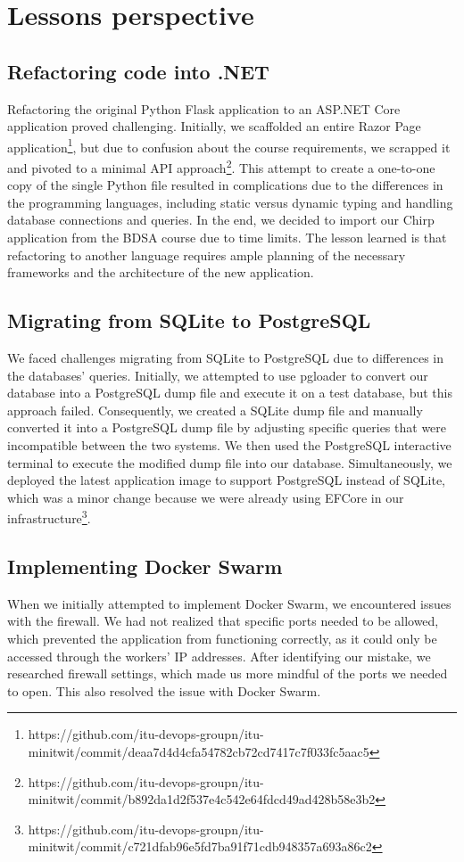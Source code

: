 \newpage
\section{Lessons perspective}
\subsection{Refactoring code into .NET}
Refactoring the original Python Flask application to an ASP.NET Core application proved challenging. Initially, we scaffolded an entire Razor Page application\footnote{https://github.com/itu-devops-groupn/itu-minitwit/commit/deaa7d4d4cfa54782cb72cd7417c7f033fc5aac5}, but due to confusion about the course requirements, we scrapped it and pivoted to a minimal API approach\footnote{https://github.com/itu-devops-groupn/itu-minitwit/commit/b892da1d2f537e4c542e64fdcd49ad428b58e3b2}. This attempt to create a one-to-one copy of the single Python file resulted in complications due to the differences in the programming languages, including static versus dynamic typing and handling database connections and queries. In the end, we decided to import our Chirp application from the BDSA course due to time limits. The lesson learned is that refactoring to another language requires ample planning of the necessary frameworks and the architecture of the new application.

\subsection{Migrating from SQLite to PostgreSQL}
We faced challenges migrating from SQLite to PostgreSQL due to differences in the databases' queries. Initially, we attempted to use pgloader to convert our database into a PostgreSQL dump file and execute it on a test database, but this approach failed. Consequently, we created a SQLite dump file and manually converted it into a PostgreSQL dump file by adjusting specific queries that were incompatible between the two systems. We then used the PostgreSQL interactive terminal to execute the modified dump file into our database. Simultaneously, we deployed the latest application image to support PostgreSQL instead of SQLite, which was a minor change because we were already using EFCore in our infrastructure\footnote{https://github.com/itu-devops-groupn/itu-minitwit/commit/c721dfab96e5fd7ba91f71cdb948357a693a86c2}. 

\subsection{Implementing Docker Swarm}
When we initially attempted to implement Docker Swarm, we encountered issues with the firewall. We had not realized that specific ports needed to be allowed, which prevented the application from functioning correctly, as it could only be accessed through the workers' IP addresses. After identifying our mistake, we researched firewall settings, which made us more mindful of the ports we needed to open. This also resolved the issue with Docker Swarm.

